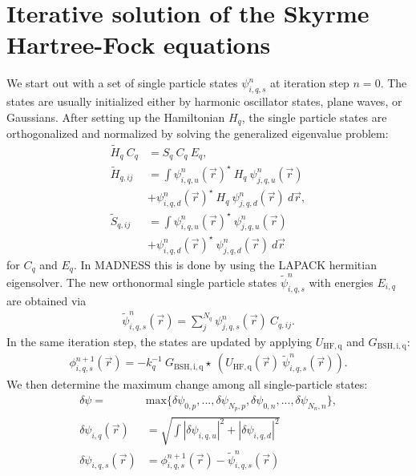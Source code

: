 \documentclass[3p]{elsarticle}
\begin{document}
\section{Iterative solution of the Skyrme Hartree-Fock equations}
\label{equations}
We start out with a set of single particle states $\psi_{i,q,s}^{n}$ at iteration step $n=0$. The states are usually initialized either by harmonic oscillator states, plane waves, or Gaussians. 
After setting up the Hamiltonian $H_q$, the single particle states are orthogonalized and normalized by solving the generalized eigenvalue problem: 
\begin{align}
\tilde{H}_q \: C_q &= S_q \: C_q \: E_q , \nonumber\\
\tilde{H}_{q,ij} &= \int \psi_{i,q,u}^n (\vec{r})^\star \: H_q \: \psi_{j,q,u}^n (\vec{r}) \nonumber\\
&+ \psi_{i,q,d}^n (\vec{r})^\star \: H_q \: \psi_{j,q,d}^n (\vec{r}) \: d \vec{r}, \\
\tilde{S}_{q,ij} &= \int \psi_{i,q,u}^n (\vec{r})^\star\: \psi_{j,q,u}^n (\vec{r})  \nonumber\\
&+ \psi_{i,q,d}^n (\vec{r})^\star\: \psi_{j,q,d}^n (\vec{r}) \: d \vec{r} 
\label{SCE}
\end{align} 
for $C_q$ and $E_q$. In \textsc{MADNESS} this is done by using the LAPACK hermitian eigensolver. The new orthonormal single particle states $\tilde{\psi}_{i,q,s}^n$ with energies $E_{i,q}$ are obtained via
\begin{align}
\tilde{\psi}_{i,q,s}^n (\vec{r}) =  \sum\nolimits_{j}^{N_q} \psi_{j,q,s}^n (\vec{r}) \: C_{q,ij} .
\end{align}
In the same iteration step, the states are updated by applying $U_\mathrm{HF,q}$ and $G_\mathrm{BSH,i,q}$:
\begin{align}
\phi_{i,q,s}^{n+1} (\vec{r}) = - k_q^{-1} \: G_\mathrm{BSH,i,q} \star \: \left( U_\mathrm{HF,q} (\vec{r}) \: \tilde{\psi}_{i,q,s}^{n} (\vec{r}) \right).
\end{align} 
We then determine the maximum change among all single-particle states:  
\begin{align}
\delta \psi =& \mathrm{max} \{ \delta \psi_{0,p}, ..., \delta \psi_{N_p,p}, \delta \psi_{0,n}, ..., \delta \psi_{N_n,n} \},  \\
\delta \psi_{i,q}(\vec{r})   & = \sqrt{ \int \left| \delta \psi_{i,q,u} \right|^2 + \left| \delta \psi_{i,q,d} \right|^2} \\
\delta \psi_{i,q,s}(\vec{r}) &= \phi_{i,q,s}^{n+1} (\vec{r}) - \tilde{\psi}_{i,q,s}^{n} (\vec{r}) 
\label{convergence}
\end{align}
\end{document}
